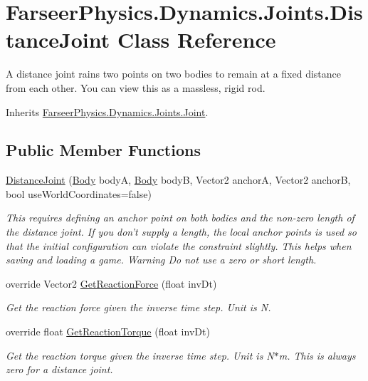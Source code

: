 \hypertarget{class_farseer_physics_1_1_dynamics_1_1_joints_1_1_distance_joint}{\section{Farseer\+Physics.\+Dynamics.\+Joints.\+Distance\+Joint Class Reference}
\label{class_farseer_physics_1_1_dynamics_1_1_joints_1_1_distance_joint}
}


A distance joint rains two points on two bodies to remain at a fixed distance from each other. You can view this as a massless, rigid rod.  




Inherits \hyperlink{class_farseer_physics_1_1_dynamics_1_1_joints_1_1_joint}{Farseer\+Physics.\+Dynamics.\+Joints.\+Joint}.

\subsection*{Public Member Functions}
\begin{DoxyCompactItemize}
\item 
\hyperlink{class_farseer_physics_1_1_dynamics_1_1_joints_1_1_distance_joint_a16a25e7ed06b94993bf0a738760f2f06}{Distance\+Joint} (\hyperlink{class_farseer_physics_1_1_dynamics_1_1_body}{Body} body\+A, \hyperlink{class_farseer_physics_1_1_dynamics_1_1_body}{Body} body\+B, Vector2 anchor\+A, Vector2 anchor\+B, bool use\+World\+Coordinates=false)
\begin{DoxyCompactList}\small\item\em This requires defining an anchor point on both bodies and the non-\/zero length of the distance joint. If you don't supply a length, the local anchor points is used so that the initial configuration can violate the constraint slightly. This helps when saving and loading a game. Warning Do not use a zero or short length. \end{DoxyCompactList}\item 
override Vector2 \hyperlink{class_farseer_physics_1_1_dynamics_1_1_joints_1_1_distance_joint_a65829cf4dd39def3d6a9dbf6f06c40ac}{Get\+Reaction\+Force} (float inv\+Dt)
\begin{DoxyCompactList}\small\item\em Get the reaction force given the inverse time step. Unit is N. \end{DoxyCompactList}\item 
override float \hyperlink{class_farseer_physics_1_1_dynamics_1_1_joints_1_1_distance_joint_a67964e7d92ff9d0ed422b00dcc2d818b}{Get\+Reaction\+Torque} (float inv\+Dt)
\begin{DoxyCompactList}\small\item\em Get the reaction torque given the inverse time step. Unit is N$\ast$m. This is always zero for a distance joint. \end{DoxyCompactList}\end{DoxyCompactItemize}
